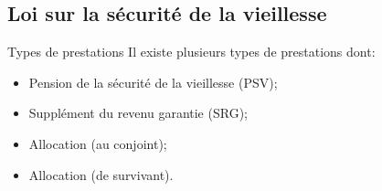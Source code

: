 \documentclass[10pt, french]{article}
\begin{document}
\begin{multicols*}{3}
\newpage

\section{Loi sur la sécurité de la vieillesse}

\begin{conceptgen}{Types de prestations}
Il existe plusieurs types de prestations dont:
\begin{itemize}[leftmargin =  *]
	\item	Pension de la sécurité de la vieillesse (PSV);
	\item	Supplément du revenu garantie (SRG);
	\item	Allocation (au conjoint);
	\item	Allocation (de survivant).
\end{itemize}
\end{conceptgen}


\end{multicols*}
\end{document}
